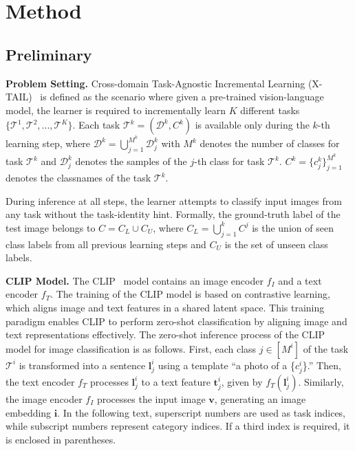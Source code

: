 \documentclass{article}
\theoremstyle{plain}
\theoremstyle{definition}
\theoremstyle{remark}
\begin{document}
\section{Method}
\subsection{Preliminary}

\textbf{Problem Setting.} 
Cross-domain Task-Agnostic Incremental Learning (X-TAIL)~\cite{xu2024advancing} is defined as the scenario where given a pre-trained vision-language model, the learner is required to incrementally learn $K$ different tasks $\{\mathcal{T}^{1}, \mathcal{T}^{2}, ..., \mathcal{T}^{K}\}$. Each task $\mathcal{T}^{k} = (\mathcal{D}^{k}, C^{k})$ is available only during the $k$-th learning step, where $\mathcal{D}^{k} = \bigcup_{j=1}^{M^{k}} \mathcal{D}^{k}_{j} $ with $M^{k}$ denotes the number of classes for task $\mathcal{T}^{k}$ and $\mathcal{D}_{j}^{k}$ denotes the samples of the $j$-th class for task $\mathcal{T}^{k}$. $C^{k} = \{c_j^{k}\}_{j=1}^{M^k}$ denotes the classnames of the task $\mathcal{T}^{k}$.

During inference at all steps, the learner attempts to classify input images from any task without the task-identity hint. Formally, the ground-truth label of the test image belongs to $C = C_{L} \cup C_{U}$, where $C_{L} = \bigcup_{j=1}^{k} C^{j}$ is the union of seen class labels from all previous learning steps and $C_{U}$ is the set of unseen class labels.

\textbf{CLIP Model.} 
The CLIP~\cite{radford2021learning} model contains an image encoder $f_I$ and a text encoder $f_T$. The training of the CLIP model is based on contrastive learning, which aligns image and text features in a shared latent space. This training paradigm enables CLIP to perform zero-shot classification by aligning image and text representations effectively. The zero-shot inference process of the CLIP model for image classification is as follows. 
First, each class $j \in [M^i]$ of the task $\mathcal{T}^{i}$ is transformed into a sentence $\boldsymbol{l}_{j}^{i}$ using a template ``a photo of a \{$c_{j}^{i}$\}.'' Then, the text encoder $f_T$ processes $\boldsymbol{l}_{j}^{i}$ to a text feature $\boldsymbol{t}_j^{i}$, given by $f_T \left( \boldsymbol{l}_j^{i} \right)$.  
Similarly, the image encoder $f_I$ processes the input image $\boldsymbol{v}$, generating an image embedding $\boldsymbol{i}$.
In the following text, superscript numbers are used as task indices, while subscript numbers represent category indices. If a third index is required, it is enclosed in parentheses.
\end{document}

